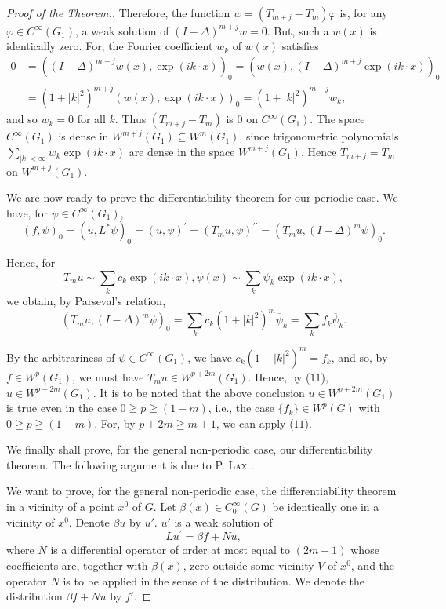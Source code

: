 \begin{proof}[Proof of the Theorem.]
Therefore, the function $w = (T_{m+j} - T_m)\varphi$ is, for any $\varphi \in C^\infty(G_1)$, a weak solution of $(I - \Delta)^{m+j}w = 0$. But, such a $w(x)$ is identically zero. For, the Fourier coefficient $w_k$ of $w(x)$ satisfies 
\[
\begin{aligned}
0 &= ((I - \Delta) ^{m+j} w (x), \exp (i k \cdot x)) _{0} = (w (x), (I - \Delta) ^{m+j} \exp (i k \cdot x)) _{0}
\\
&= (1 + | k | ^{2}) ^{m+j} (w (x), \exp (i k \cdot x)) _{0} = (1 + | k | ^{2}) ^{m+j} w _{k},
\end{aligned}
\]
and so $w_{k} = 0$ for all $k$. Thus $(T_{m+j} - T_{m})$ is $0$ on $C^\infty(G_1)$. The space $C^\infty(G_1)$ is dense in $W^{m+j}(G_1) \subseteq W^m(G_1)$, since trigonometric polynomials $\sum\limits_{|k| < \infty} w_k \exp(ik \cdot x)$ are dense in the space $W^{m+j}(G_1)$. Hence $T_{m+j} = T_m$ on $W^{m+j}(G_1)$. 

We are now ready to prove the differentiability theorem for our periodic case. We have, for $\psi\in C^{\infty}(G_{1})$, 
\[
(f, \psi) _{0} = (u, L ^{*} \psi) _{0} = (u, \psi) ^{\prime} = (T _{m} u, \psi) ^{\prime \prime} = (T _{m} u, (I - \Delta) ^{m} \psi) _{0}.
\]

Hence, for 
\[
T _{m} u \sim \sum\limits_{k} c _{k} \exp (i k \cdot x), \psi (x) \sim \sum\limits_{k} \psi_{k} \exp (i k \cdot x),
\]
we obtain, by Parseval's relation, 
\[
(T _{m} u, (I - \Delta) ^{m} \psi) _{0} = \sum\limits_{k} c _{k} (1 + | k | ^{2}) ^{m} \overline {{{\psi}}} _{k} = \sum\limits_{k} f _{k} \overline {{{\psi}}} _{k}.
\]

By the arbitrariness of $\psi \in C^{\infty}(G_{1})$, we have $c_k(1 + |k|^2)^m = f_k$, and so, by $f \in W^{p}(G_{1})$, we must have $T_m u \in W^{p+2m}(G_1)$. Hence, by ($11$), $u \in W^{p+2m}(G_1)$. It is to be noted that the above conclusion $u \in W^{p+2m}(G_1)$ is true even in the case $0 \geqq p \geqq (1-m)$, i.e., the case $\{f_k\} \in W^{p}(G)$ with $0 \geqq p \geqq (1-m)$. For, by $p + 2m \geqq m + 1$, we can apply ($11$). 

We finally shall prove, for the general non-periodic case, our differentiability theorem. The following argument is due to P. \textsc{Lax} \cite{lewy172}. 

We want to prove, for the general non-periodic case, the differentiability theorem in a vicinity of a point $x^{0}$ of $G$. Let $\beta(x) \in C_{0}^{\infty}(G)$ be identically one in a vicinity of $x^{0}$. Denote $\beta u$ by $u'$. $u'$ is a weak solution of 
\begin{equation}\label{eq:VI.9.12}
L u ^{\prime} = \beta f + N u,
\end{equation}
where $N$ is a differential operator of order at most equal to $(2m-1)$ whose coefficients are, together with $\beta(x)$, zero outside some vicinity $V$ of $x^{0}$, and the operator $N$ is to be applied in the sense of the distribution. We denote the distribution $\beta f + Nu$ by $f'$. 


\end{proof}
